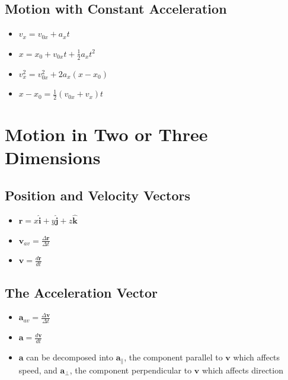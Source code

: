 \documentclass{article}
\begin{document}
\setcounter{subsection}{3}
\subsection{Motion with Constant Acceleration}

\begin{itemize}
    \item $v_x=v_{0x}+a_xt$

    \item $x=x_0+v_{0x}t+\frac{1}{2}a_xt^2$

    \item $v_x^2=v_{0x}^2+2a_x\left(x-x_0\right)$

    \item $x-x_0=\frac{1}{2}\left(v_{0x}+v_x\right)t$
\end{itemize}

\section{Motion in Two or Three Dimensions}

\subsection{Position and Velocity Vectors}

\begin{itemize}
    \item $\mathbf{r}=x\hat{\mathbf{i}}+y\hat{\mathbf{j}}+z\hat{\mathbf{k}}$

    \item $\mathbf{v}_{av}=\frac{\Delta\mathbf{r}}{\Delta t}$

    \item $\mathbf{v}=\frac{d\mathbf{r}}{dt}$
\end{itemize}

\subsection{The Acceleration Vector}

\begin{itemize}
    \item $\mathbf{a}_{av}=\frac{\Delta\mathbf{v}}{\Delta t}$

    \item $\mathbf{a}=\frac{d\mathbf{v}}{dt}$

    \item $\mathbf{a}$ can be decomposed into $\mathbf{a}_\parallel$, the component parallel to $\mathbf{v}$ which affects speed, and $\mathbf{a}_\perp$, the component perpendicular to $\mathbf{v}$ which affects direction
\end{itemize}
\end{document}
